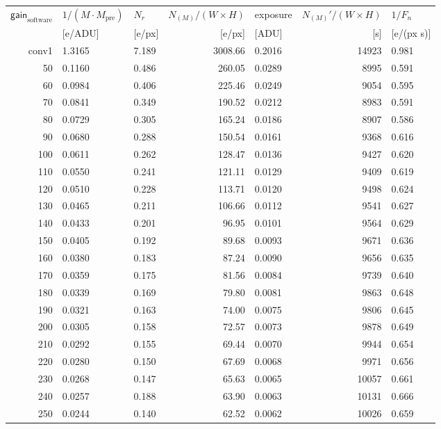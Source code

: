 \begin{table}[!htbp]
  \centering
  \begin{tabular}{r l l r  l r l}
\hline
$\textsf{gain}_\textrm{software}$ & $1/(M\cdot M_\textrm{pre})$ & $N_r$ & $N_{(M)}/(W\times H)$ &  \textsf{exposure} & $N_{(M)}'/(W\times H)$ & $1/F_n$ \\
 & [e/ADU] & [e/px] & [e/px] & [ADU] & [s] & [e/(px s)]  \\
\hline
conv1 & 1.3165 & 7.189 & 3008.66      & 0.2016 & 14923 & 0.981 \\
50 & 0.1160 & 0.486 & 260.05 & 0.0289 & 8995 & 0.591 \\
60 & 0.0984 & 0.406 & 225.46 & 0.0249 & 9054 & 0.595 \\
70 & 0.0841 & 0.349 & 190.52 & 0.0212 & 8983 & 0.591 \\
80 & 0.0729 & 0.305 & 165.24 & 0.0186 & 8907 & 0.586 \\
90 & 0.0680 & 0.288 & 150.54 & 0.0161 & 9368 & 0.616 \\
100 & 0.0611 & 0.262 & 128.47 & 0.0136 & 9427 & 0.620 \\
110 & 0.0550 & 0.241 & 121.11 & 0.0129 & 9409 & 0.619 \\
120 & 0.0510 & 0.228 & 113.71 & 0.0120 & 9498 & 0.624 \\
130 & 0.0465 & 0.211 & 106.66 & 0.0112 & 9541 & 0.627 \\
140 & 0.0433 & 0.201 & 96.95 & 0.0101 & 9564 & 0.629 \\
150 & 0.0405 & 0.192 & 89.68 & 0.0093 & 9671 & 0.636 \\
160 & 0.0380 & 0.183 & 87.24 & 0.0090 & 9656 & 0.635 \\
170 & 0.0359 & 0.175 & 81.56 & 0.0084 & 9739 & 0.640 \\
180 & 0.0339 & 0.169 & 79.80 & 0.0081 & 9863 & 0.648 \\
190 & 0.0321 & 0.163 & 74.00 & 0.0075 & 9806 & 0.645 \\
200 & 0.0305 & 0.158 & 72.57 & 0.0073 & 9878 & 0.649 \\
210 & 0.0292 & 0.155 & 69.44 & 0.0070 & 9944 & 0.654 \\
220 & 0.0280 & 0.150 & 67.69 & 0.0068 & 9971 & 0.656 \\
230 & 0.0268 & 0.147 & 65.63 & 0.0065 & 10057 & 0.661 \\
240 & 0.0257 & 0.188 & 63.90 & 0.0063 & 10131 & 0.666 \\
250 & 0.0244 & 0.140 & 62.52 & 0.0062 & 10026 & 0.659 \\

\end{tabular}
\end{table}
